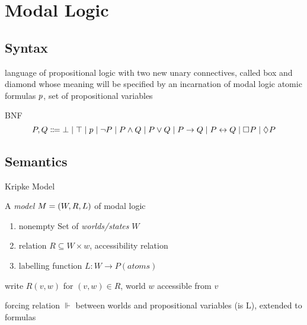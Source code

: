     \section{Modal Logic}
        \label{sec:Modal-logic}

        \subsection{Syntax}
            \label{sec:ML-yntax}

            \cite{Huth04LogicInCS}
            language of propositional logic with two new unary connectives, called box and diamond whose meaning will be specified by an incarnation of modal logic
            atomic formulas $p$, set of propositional variables
            \begin{definition}[Syntax]
                BNF
                \begin{equation}
                    P,Q \Coloneqq
                        \bot \mid
                        \top \mid
                        p \mid
                        \lnot P \mid
                        P\land Q \mid
                        P\lor Q \mid
                        P\rightarrow Q \mid
                        P\leftrightarrow Q \mid
                        \square_{}{P} \mid
                        \lozenge_{}{P}
                \end{equation}
            \end{definition}

        \subsection{Semantics}
            \label{sec:ML-semantics}

            \cite{Huth04LogicInCS}
            Kripke Model
            \begin{definition}[Model]
                A \textit{model} $M=(W,R,L)$ of modal logic
                \begin{enumerate}
                    \item nonempty Set of \textit{worlds/states} $W$
                    \item relation $R\subseteq W\times w$, accessibility relation
                    \item labelling function $L:W\to P(atoms)$
                \end{enumerate}
                write $R(v,w)$ for $(v,w)\in R$, world $w$ accessible from $v$

            \end{definition}
            forcing relation $\Vdash$ between worlds and propositional variables (is L),
            extended to formulas

